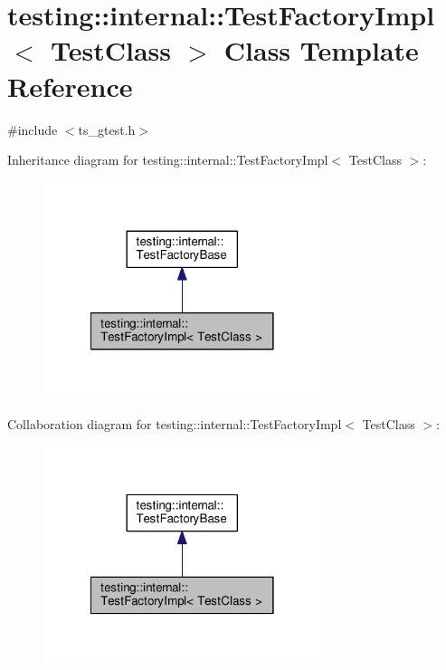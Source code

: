 \hypertarget{classtesting_1_1internal_1_1TestFactoryImpl}{\section{testing\-:\-:internal\-:\-:Test\-Factory\-Impl$<$ Test\-Class $>$ Class Template Reference}
\label{classtesting_1_1internal_1_1TestFactoryImpl}
}


{\ttfamily \#include $<$ts\-\_\-gtest.\-h$>$}



Inheritance diagram for testing\-:\-:internal\-:\-:Test\-Factory\-Impl$<$ Test\-Class $>$\-:\nopagebreak
\begin{figure}[H]
\begin{center}
\leavevmode
\includegraphics[width=230pt]{classtesting_1_1internal_1_1TestFactoryImpl__inherit__graph}
\end{center}
\end{figure}


Collaboration diagram for testing\-:\-:internal\-:\-:Test\-Factory\-Impl$<$ Test\-Class $>$\-:\nopagebreak
\begin{figure}[H]
\begin{center}
\leavevmode
\includegraphics[width=230pt]{classtesting_1_1internal_1_1TestFactoryImpl__coll__graph}
\end{center}
\end{figure}
